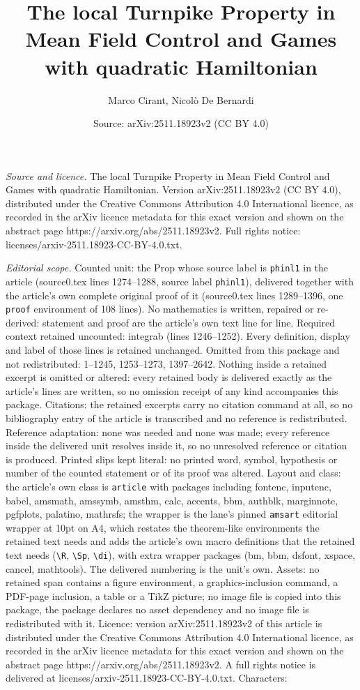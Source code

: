 \documentclass[10pt,a4paper]{amsart}
\title[The local Turnpike Property in Mean Field Control and Games ]{The local Turnpike Property in Mean Field Control and Games with quadratic Hamiltonian}
\author{Marco Cirant, Nicol\`o De Bernardi}
\date{Source: arXiv:2511.18923v2 (CC BY 4.0)}
\begin{document}
\maketitle

\noindent\emph{Source and licence.} The local Turnpike Property in Mean Field Control and Games with quadratic Hamiltonian. Version arXiv:2511.18923v2 (CC BY 4.0), distributed under the Creative Commons Attribution 4.0 International licence, as recorded in the arXiv licence metadata for this exact version and shown on the abstract page https://arxiv.org/abs/2511.18923v2. Full rights notice: licenses/arxiv-2511.18923-CC-BY-4.0.txt.\par\smallskip

\noindent\textit{Editorial scope.} Counted unit: the Prop whose source label is \texttt{phinl1} in the article (source0.tex lines 1274--1288, source label \texttt{phinl1}), delivered together with the article's own complete original proof of it (source0.tex lines 1289--1396, one \texttt{proof} environment of 108 lines). No mathematics is written, repaired or re-derived: statement and proof are the article's own text line for line. Required context retained uncounted: integrab (lines 1246--1252). Every definition, display and label of those lines is retained unchanged. Omitted from this package and not redistributed: 1--1245, 1253--1273, 1397--2642. Nothing inside a retained excerpt is omitted or altered: every retained body is delivered exactly as the article's lines are written, so no omission receipt of any kind accompanies this package. Citations: the retained excerpts carry no citation command at all, so no bibliography entry of the article is transcribed and no reference is redistributed. Reference adaptation: none was needed and none was made; every reference inside the delivered unit resolves inside it, so no unresolved reference or citation is produced. Printed slips kept literal: no printed word, symbol, hypothesis or number of the counted statement or of its proof was altered. Layout and class: the article's own class is \texttt{article} with packages including fontenc, inputenc, babel, amsmath, amssymb, amsthm, calc, accents, bbm, authblk, marginnote, pgfplots, palatino, mathrsfs; the wrapper is the lane's pinned \texttt{amsart} editorial wrapper at 10pt on A4, which restates the theorem-like environments the retained text needs and adds the article's own macro definitions that the retained text needs (\texttt{\textbackslash R}, \texttt{\textbackslash Sp}, \texttt{\textbackslash di}), with extra wrapper packages (bm, bbm, dsfont, xspace, cancel, mathtools). The delivered numbering is the unit's own. Assets: no retained span contains a figure environment, a graphics-inclusion command, a PDF-page inclusion, a table or a TikZ picture; no image file is copied into this package, the package declares no asset dependency and no image file is redistributed with it. Licence: version arXiv:2511.18923v2 of this article is distributed under the Creative Commons Attribution 4.0 International licence, as recorded in the arXiv licence metadata for this exact version and shown on the abstract page https://arxiv.org/abs/2511.18923v2. A full rights notice is delivered at licenses/arxiv-2511.18923-CC-BY-4.0.txt. Characters: 
\end{document}
